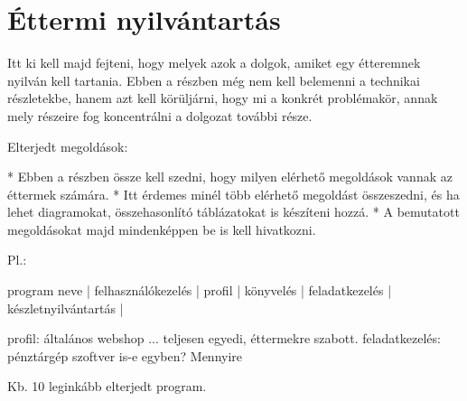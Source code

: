 \chapter{Éttermi nyilvántartás}

Itt ki kell majd fejteni, hogy melyek azok a dolgok, amiket egy étteremnek nyilván kell tartania. Ebben a részben még nem kell belemenni a technikai részletekbe, hanem azt kell körüljárni, hogy mi a konkrét problémakör, annak mely részeire fog koncentrálni a dolgozat további része.

Elterjedt megoldások:

* Ebben a részben össze kell szedni, hogy milyen elérhető megoldások vannak az éttermek számára.
* Itt érdemes minél több elérhető megoldást összeszedni, és ha lehet diagramokat, összehasonlító táblázatokat is készíteni hozzá.
* A bemutatott megoldásokat majd mindenképpen be is kell hivatkozni.


Pl.:

program neve | felhasználókezelés | profil | könyvelés | feladatkezelés | készletnyilvántartás |

profil: általános webshop ... teljesen egyedi, éttermekre szabott.
feladatkezelés: pénztárgép szoftver is-e egyben? Mennyire

Kb. 10 leginkább elterjedt program.
